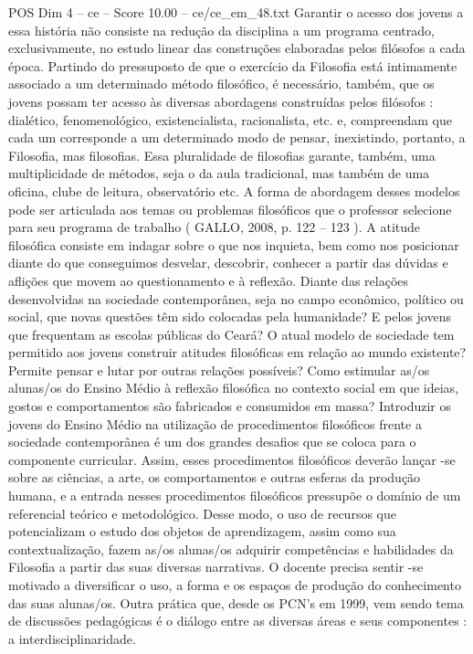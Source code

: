 \begin{textsample}{POS Dim 4 – ce – Score 10.00 – ce/ce\_em\_48.txt}
Garantir o acesso dos jovens a essa história não consiste na redução da disciplina a um programa centrado, exclusivamente, no estudo linear das construções elaboradas pelos filósofos a cada época.
Partindo do pressuposto de que o exercício da Filosofia está intimamente associado a um determinado método filosófico, é necessário, também, que os jovens possam ter acesso às diversas abordagens construídas pelos filósofos : dialético, fenomenológico, existencialista, racionalista, etc. e, compreendam que cada um corresponde a um determinado modo de pensar, inexistindo, portanto, a Filosofia, mas filosofias.
Essa pluralidade de filosofias garante, também, uma multiplicidade de métodos, seja o da aula tradicional, mas também de uma oficina, clube de leitura, observatório etc.
A forma de abordagem desses modelos pode ser articulada aos temas ou problemas filosóficos que o professor selecione para seu programa de trabalho ( GALLO, 2008, p. 122 – 123 ).
A atitude filosófica consiste em indagar sobre o que nos inquieta, bem como nos posicionar diante do que conseguimos desvelar, descobrir, conhecer a partir das dúvidas e aflições que movem ao questionamento e à reflexão.
Diante das relações desenvolvidas na sociedade contemporânea, seja no campo econômico, político ou social, que novas questões têm sido colocadas pela humanidade?
E pelos jovens que frequentam as escolas públicas do Ceará?
O atual modelo de sociedade tem permitido aos jovens construir atitudes filosóficas em relação ao mundo existente?
Permite pensar e lutar por outras relações possíveis?
Como estimular as/os alunas/os do Ensino Médio à reflexão filosófica no contexto social em que ideias, gostos e comportamentos são fabricados e consumidos em massa?
Introduzir os jovens do Ensino Médio na utilização de procedimentos filosóficos frente a sociedade contemporânea é um dos grandes desafios que se coloca para o componente curricular.
Assim, esses procedimentos filosóficos deverão lançar -se sobre as ciências, a arte, os comportamentos e outras esferas da produção humana, e a entrada nesses procedimentos filosóficos pressupõe o domínio de um referencial teórico e metodológico.
Desse modo, o uso de recursos que potencializam o estudo dos objetos de aprendizagem, assim como sua contextualização, fazem as/os alunas/os adquirir competências e habilidades da Filosofia a partir das suas diversas narrativas.
O docente precisa sentir -se motivado a diversificar o uso, a forma e os espaços de produção do conhecimento das suas alunas/os.
Outra prática que, desde os PCN’s em 1999, vem sendo tema de discussões pedagógicas é o diálogo entre as diversas áreas e seus componentes : a interdisciplinaridade.

\end{textsample}
